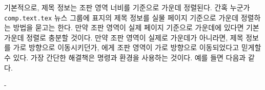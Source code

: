 기본적으로, 제목 정보는 조판 영역 너비를 기준으로
가운데 정렬된다.
간혹 누군가 \texttt{comp.text.tex} 뉴스 그룹에 표지의 제목 정보를 실물 페이지
기준으로 가운데 정렬하는 방법을 묻고는 한다.
만약 조판 영역이 실제 페이지 기준으로 가운데에 있다면
기본 가운데 정렬로 충분할 것이다.
만약 조판 영역이 실제로 가운데가 아니라면, 제목 정보를
가로 방향으로 이동시키던가, \cmd{\maketitle}에게 조판
영역이 가로 방향으로 이동되었다고 믿게할 수 있다.
가장 간단한 해결책은 \cmd{\calccentering} 명령과  환경을
사용하는 것이다.
예를 들면 다음과 같다.
\begin{lcode}
\begin{titlingpage}
  \calccentering{\unitlength}
  \begin{adjustwidth*}{\unitlength}{-\unitlength}
    \maketitle
  \end{adjustwidth*}
\end{titlingpage}
\end{lcode}


